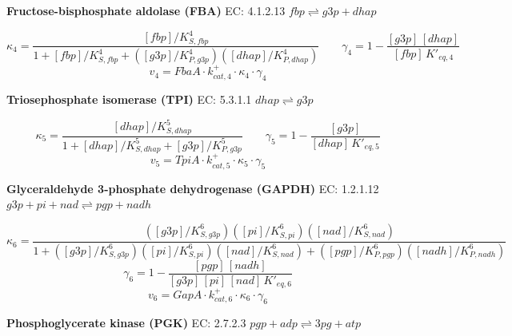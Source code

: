 \textbf{Fructose-bisphosphate aldolase (FBA)} \quad EC: 4.1.2.13 \quad $fbp \rightleftharpoons g3p + dhap$

\begin{equation}
    \kappa_4 = \frac{[fbp]/K_{S,fbp}^4}%
                    {1 + [fbp]/K_{S,fbp}^4 + ([g3p]/K_{P,g3p}^4)([dhap]/K_{P,dhap}^4)}
    \qquad
    \gamma_4 = 1 - \frac{[g3p]\,[dhap]}{[fbp]\,K'_{eq,4}}
\end{equation}
\begin{equation}
    v_4 = FbaA \cdot k^+_{cat,4} \cdot \kappa_4 \cdot \gamma_4
    \label{eqn: fba}
\end{equation}

\textbf{Triosephosphate isomerase (TPI)} \quad EC: 5.3.1.1 \quad $dhap \rightleftharpoons g3p$

\begin{equation}
    \kappa_5 = \frac{[dhap]/K_{S,dhap}^5}%
                    {1 + [dhap]/K_{S,dhap}^5 + [g3p]/K_{P,g3p}^5}
    \qquad
    \gamma_5 = 1 - \frac{[g3p]}{[dhap]\,K'_{eq,5}}
\end{equation}
\begin{equation}
    v_5 = TpiA \cdot k^+_{cat,5} \cdot \kappa_5 \cdot \gamma_5
    \label{eqn: tpi}
\end{equation}

\textbf{Glyceraldehyde 3-phosphate dehydrogenase (GAPDH)} \quad EC: 1.2.1.12 \quad $g3p + pi + nad \rightleftharpoons pgp + nadh$

\begin{equation}
    \kappa_6 = \frac{([g3p]/K_{S,g3p}^6)([pi]/K_{S,pi}^6)([nad]/K_{S,nad}^6)}%
                    {1 + ([g3p]/K_{S,g3p}^6)([pi]/K_{S,pi}^6)([nad]/K_{S,nad}^6) + ([pgp]/K_{P,pgp}^6)([nadh]/K_{P,nadh}^6)}
\end{equation}
\begin{equation}
    \gamma_6 = 1 - \frac{[pgp]\,[nadh]}{[g3p]\,[pi]\,[nad]\,K'_{eq,6}}
\end{equation}
\begin{equation}
    v_6 = GapA \cdot k^+_{cat,6} \cdot \kappa_6 \cdot \gamma_6
    \label{eqn: gapdh}
\end{equation}

\textbf{Phosphoglycerate kinase (PGK)} \quad EC: 2.7.2.3 \quad $pgp + adp \rightleftharpoons 3pg + atp$

